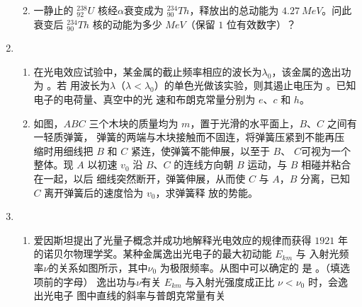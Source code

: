 \begin{enumerate}
\begin{enumerate}
 
 
\item 
一静止的 ${ }_{92}^{238} U$ 核经$ \alpha $衰变成为 ${ }_{90}^{234} Th$，释放出的总动能为 $ 4.27 \ MeV $。问此衰变后 ${ }_{90}^{234} Th$
核的动能为多少 $ MeV $（保留 $ 1 $ 位有效数字）？






\end{enumerate}


\item 
{}
\begin{enumerate}
	\item
在光电效应试验中，某金属的截止频率相应的波长为$ \lambda _{0} $，该金属的逸出功为 \underlinegap 。若
用波长为$ \lambda $（$ \lambda < \lambda _{0} $）的单色光做该实验，则其遏止电压为 \underlinegap 。已知电子的电荷量、真空中的光
速和布朗克常量分别为 $ e $、$ c $ 和 $ h $。



\item 
如图，$ ABC $ 三个木块的质量均为 $ m $，置于光滑的水平面上，$ B $、$ C $ 之间有一轻质弹簧，
弹簧的两端与木块接触而不固连，将弹簧压紧到不能再压
缩时用细线把 $ B $ 和 $ C $ 紧连，使弹簧不能伸展，以至于 $ B $、
$ C $可视为一个整体。现 $ A $ 以初速 $ v_{0} $ 沿 $ B $、$ C $ 的连线方向朝 $ B $ 运动，与 $ B $ 相碰并粘合在一起，以后
细线突然断开，弹簧伸展，从而使 $ C $ 与 $ A $，$ B $ 分离，已知 $ C $ 离开弹簧后的速度恰为 $ v_{0} $，求弹簧释
放的势能。
\begin{figure}[h!]
	\flushright
	
\end{figure}



\end{enumerate}


\item 
{}
\begin{enumerate}
	\item
爱因斯坦提出了光量子概念并成功地解释光电效应的规律而获得
$ 1921 $ 年的诺贝尔物理学奖。某种金属逸出光电子的最大初动能 $ E_{km} $ 与
入射光频率$ \nu $的关系如图所示，其中$ \nu _{0} $ 为极限频率。从图中可以确定的
是 \underlinegap 。（填选项前的字母）
\fourchoices
{逸出功与$ \nu $有关}
{$ E_{km} $ 与入射光强度成正比}
{$ \nu < \nu _{0} $ 时，会逸出光电子}
{图中直线的斜率与普朗克常量有关}



\end{enumerate}
\end{enumerate}
